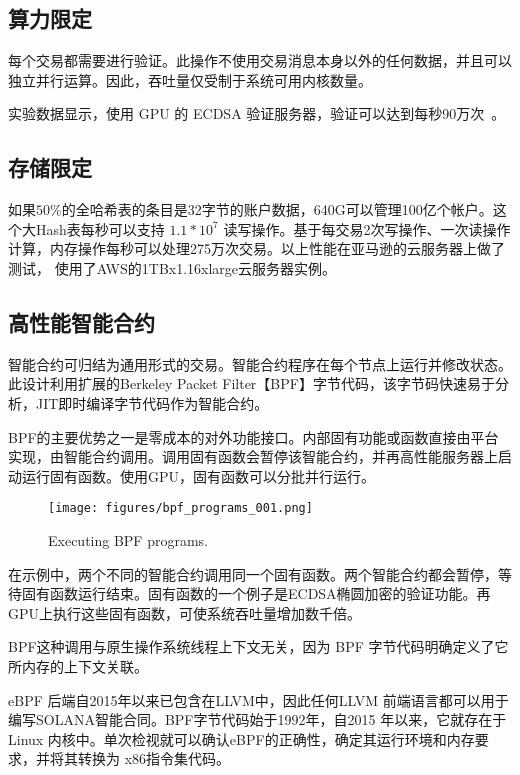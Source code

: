 \documentclass[12pt, uft8]{ctexart}
\begin{document}
\subsection{算力限定}
每个交易都需要进行验证。此操作不使用交易消息本身以外的任何数据，并且可以独立并行运算。因此，吞吐量仅受制于系统可用内核数量。  

实验数据显示，使用 GPU 的 ECDSA 验证服务器，验证可以达到每秒90万次~\cite{gpuecc}。

\subsection{存储限定}
如果\(50\%\)的全哈希表的条目是32字节的账户数据，640G可以管理100亿个帐户。这个大Hash表每秒可以支持 \(1.1 * 10^7\) 读写操作。基于每交易2次写操作、一次读操作计算，内存操作每秒可以处理275万次交易。以上性能在亚马逊的云服务器上做了测试， 使用了AWS的1TBx1.16xlarge云服务器实例。

\subsection{高性能智能合约}\label{sec:smartcontracts}

智能合约可归结为通用形式的交易。智能合约程序在每个节点上运行并修改状态。此设计利用扩展的Berkeley Packet Filter【BPF】字节代码，该字节码快速易于分析，JIT即时编译字节代码作为智能合约。

BPF的主要优势之一是零成本的对外功能接口。内部固有功能或函数直接由平台实现，由智能合约调用。调用固有函数会暂停该智能合约，并再高性能服务器上启动运行固有函数。使用GPU，固有函数可以分批并行运行。

\begin{figure}
  \begin{center}
    \centering
    \texttt{[image: figures/bpf\_programs\_001.png]}
    \caption[Fig 11]{Executing  BPF programs.\label{fig_11}}
  \end{center}
  \end{figure}

在示例中，两个不同的智能合约调用同一个固有函数。两个智能合约都会暂停，等待固有函数运行结束。固有函数的一个例子是ECDSA椭圆加密的验证功能。再 GPU上执行这些固有函数，可使系统吞吐量增加数千倍。

BPF这种调用与原生操作系统线程上下文无关，因为 BPF 字节代码明确定义了它所内存的上下文关联。

eBPF 后端自2015年以来已包含在LLVM中，因此任何LLVM 前端语言都可以用于编写SOLANA智能合同。BPF字节代码始于1992年，自2015 年以来，它就存在于Linux 内核中。单次检视就可以确认eBPF的正确性，确定其运行环境和内存要求，并将其转换为 x86指令集代码。
\end{document}
